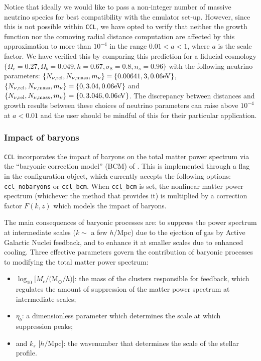 \documentclass[\docopts]{\docclass}
\newcommand{\ccl}{{\tt CCL}\xspace}
\begin{document}
Notice that ideally we would like to pass a non-integer number of massive neutrino species for best compatibility with the emulator set-up. However, since this is not possible within {\tt CCL}, we have opted to verify that neither the growth function nor the comoving radial distance computation are affected by this approximation to more than $10^{-4}$ in the range $0.01<a<1$, where $a$ is the scale factor. We have verified this by comparing this prediction for a fiducial cosmology $\{\Omega_c=0.27,\Omega_b=0.049,h=0.67,\sigma_8=0.8,n_s=0.96\}$ with the following neutrino parameters: $\{N_{\nu,{\rm rel}},N_{\nu,{\rm mass}},m_{\nu}\}=\{0.00641,3,0.06{\rm eV}\}$, $\{N_{\nu,{\rm rel}},N_{\nu,{\rm mass}},m_{\nu}\}=\{0,3.04,0.06{\rm eV}\}$ and $\{N_{\nu,{\rm rel}},N_{\nu,{\rm mass}},m_{\nu}\}=\{0,3.046,0.06{\rm eV}\}$. The discrepancy between distances and growth results between these choices of neutrino parameters can raise above $10^{-4}$ at $a<0.01$ and the user should be mindful of this for their particular application.

\subsubsection{Impact of baryons}
\label{ss:baryons}

\ccl incorporates the impact of baryons on the total matter power spectrum via the ``baryonic correction model'' (BCM) of \citet{Schneider15}. This is implemented through a flag in the configuration object, which currently accepts the following options: {\tt ccl\_nobaryons} or {\tt ccl\_bcm}. When {\tt ccl\_bcm} is set, the nonlinear matter power spectrum (whichever the method that provides it) is multiplied by a correction factor $F(k,z)$ which models the impact of baryons.

The main consequences of baryonic processes are: to suppress the power spectrum at intermediate scales ($k\sim$ a few $h/$Mpc) due to the ejection of gas by Active Galactic Nuclei feedback, and to enhance it at smaller scales due to enhanced cooling. Three effective parameters govern the contribution of baryonic processes to modifying the total matter power spectrum:

\begin{itemize}
  \item $\log_{10} [M_c/($M$_\odot/h)]$: the mass of the clusters responsible for feedback, which regulates the amount of suppression of the matter power spectrum at intermediate scales;
  \item $\eta_b$: a dimensionless parameter which determines the scale at which suppression peaks;
  \item and $k_s$ [$h/$Mpc]: the wavenumber that determines the scale of the stellar profile.
\end{itemize}
\end{document}
